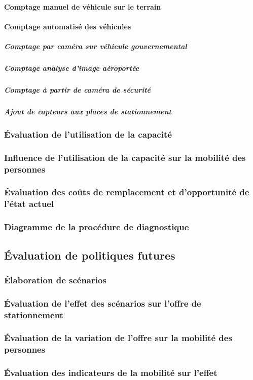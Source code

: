     \paragraph{Comptage manuel de véhicule sur le terrain}
    \paragraph{Comptage automatisé des véhicules}
      \subparagraph{Comptage par caméra sur véhicule gouvernemental}
      \subparagraph{Comptage analyse d'image aéroportée}
      \subparagraph{Comptage à partir de caméra de sécurité}
      \subparagraph{Ajout de capteurs aux places de stationnement}
        \subsubsection{Évaluation de l'utilisation de la capacité}
        \subsubsection{Influence de l'utilisation de la capacité sur la mobilité des personnes}
        \subsubsection{Évaluation des coûts de remplacement et d'opportunité de l'état actuel}
        \subsubsection{Diagramme de la procédure de diagnostique}
    \subsection{Évaluation de politiques futures}
        \subsubsection{Élaboration de scénarios}
        \subsubsection{Évaluation de l'effet des scénarios sur l'offre de stationnement}
        \subsubsection{Évaluation de la variation de l'offre sur la mobilité des personnes}
        \subsubsection{Évaluation des indicateurs de la mobilité sur l'effet}

